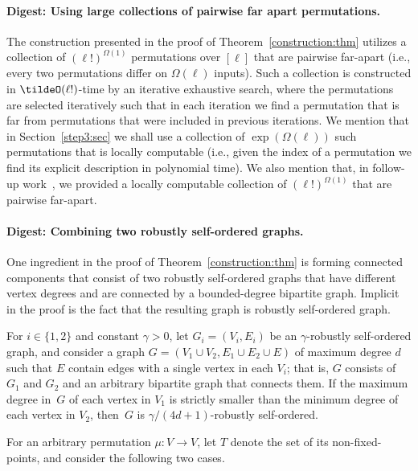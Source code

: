 \paragraph{Digest: Using large collections of pairwise far apart permutations.}
The construction presented in the proof of Theorem~\ref{construction:thm}
utilizes a collection of $(\ell!)^{\Omega(1)}$ permutations over $[\ell]$
that are pairwise far-apart (i.e., every two permutations differ
on $\Omega(\ell)$ inputs). Such a collection is constructed
in $\tildeO(\ell!)$-time by an iterative exhaustive search,
where the permutations are selected iteratively such that
in each iteration we find a permutation that is far from
permutations that were included in previous iterations.
We mention that in Section~\ref{step3:sec} we shall use
a collection of $\exp(\Omega(\ell))$ such permutations that is
locally computable (i.e., given the index of a permutation
we find its explicit description in polynomial time).
We also mention that, in follow-up work~\cite{GW:perm},
we provided a locally computable collection of $(\ell!)^{\Omega(1)}$
that are pairwise far-apart.


\paragraph{Digest: Combining two robustly self-ordered graphs.}
One ingredient in the proof of Theorem~\ref{construction:thm}
is forming connected components that consist of two
robustly self-ordered graphs that have different vertex degrees
and are connected by a bounded-degree bipartite graph.
Implicit in the proof is the fact that
the resulting graph is robustly self-ordered graph.

\label{bd:bipartite:clm}
%
%
%
%
%
%
%
%
%
%
For $i\in\{1,2\}$ and constant \mbox{$\gamma>0$},
let $G_i=(V_i,E_i)$ be an $\gamma$-robustly self-ordered graph,
and consider a graph $G=(V_1\cup V_2,E_1\cup E_2\cup E)$
of maximum degree $d$
such that $E$ contain edges with a single vertex in each $V_i$;
that is, $G$ consists of~$G_1$ and $G_2$
and an arbitrary bipartite graph that connects them.
If the maximum degree in~$G$ of each vertex in $V_1$
is strictly smaller than the minimum degree of each vertex in $V_2$,
then~$G$ is $\gamma/(4d+1)$-robustly self-ordered.
\ECM

\BPFS
For an arbitrary permutation $\mu:V\to V$,
let $T$ denote the set of its non-fixed-points,
and consider the following two cases.

